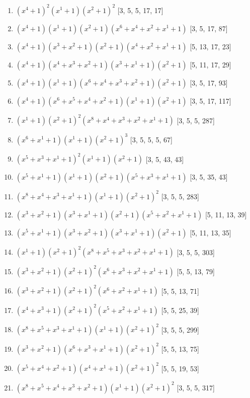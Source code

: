\documentclass[10pt,twocolumn]{article}
\begin{document}
\begin{enumerate}
\item $(x^{4} + 1)^{2}(x^{1} + 1)(x^{2} + 1)^{2}$  [3, 5, 5, 17, 17]
\item $(x^{4} + 1)(x^{1} + 1)(x^{2} + 1)(x^{6} + x^{4} + x^{2} + x^{1} + 1)$  [3, 5, 17, 87]
\item $(x^{4} + 1)(x^{3} + x^{2} + 1)(x^{2} + 1)(x^{4} + x^{2} + x^{1} + 1)$  [5, 13, 17, 23]
\item $(x^{4} + 1)(x^{4} + x^{3} + x^{2} + 1)(x^{3} + x^{1} + 1)(x^{2} + 1)$  [5, 11, 17, 29]
\item $(x^{4} + 1)(x^{1} + 1)(x^{6} + x^{4} + x^{3} + x^{2} + 1)(x^{2} + 1)$  [3, 5, 17, 93]
\item $(x^{4} + 1)(x^{6} + x^{5} + x^{4} + x^{2} + 1)(x^{1} + 1)(x^{2} + 1)$  [3, 5, 17, 117]
\item $(x^{1} + 1)(x^{2} + 1)^{2}(x^{8} + x^{4} + x^{3} + x^{2} + x^{1} + 1)$  [3, 5, 5, 287]
\item $(x^{6} + x^{1} + 1)(x^{1} + 1)(x^{2} + 1)^{3}$  [3, 5, 5, 5, 67]
\item $(x^{5} + x^{3} + x^{1} + 1)^{2}(x^{1} + 1)(x^{2} + 1)$  [3, 5, 43, 43]
\item $(x^{5} + x^{1} + 1)(x^{1} + 1)(x^{2} + 1)(x^{5} + x^{3} + x^{1} + 1)$  [3, 5, 35, 43]
\item $(x^{8} + x^{4} + x^{3} + x^{1} + 1)(x^{1} + 1)(x^{2} + 1)^{2}$  [3, 5, 5, 283]
\item $(x^{3} + x^{2} + 1)(x^{3} + x^{1} + 1)(x^{2} + 1)(x^{5} + x^{2} + x^{1} + 1)$  [5, 11, 13, 39]
\item $(x^{5} + x^{1} + 1)(x^{3} + x^{2} + 1)(x^{3} + x^{1} + 1)(x^{2} + 1)$  [5, 11, 13, 35]
\item $(x^{1} + 1)(x^{2} + 1)^{2}(x^{8} + x^{5} + x^{3} + x^{2} + x^{1} + 1)$  [3, 5, 5, 303]
\item $(x^{3} + x^{2} + 1)(x^{2} + 1)^{2}(x^{6} + x^{3} + x^{2} + x^{1} + 1)$  [5, 5, 13, 79]
\item $(x^{3} + x^{2} + 1)(x^{2} + 1)^{2}(x^{6} + x^{2} + x^{1} + 1)$  [5, 5, 13, 71]
\item $(x^{4} + x^{3} + 1)(x^{2} + 1)^{2}(x^{5} + x^{2} + x^{1} + 1)$  [5, 5, 25, 39]
\item $(x^{8} + x^{5} + x^{3} + x^{1} + 1)(x^{1} + 1)(x^{2} + 1)^{2}$  [3, 5, 5, 299]
\item $(x^{3} + x^{2} + 1)(x^{6} + x^{3} + x^{1} + 1)(x^{2} + 1)^{2}$  [5, 5, 13, 75]
\item $(x^{5} + x^{4} + x^{2} + 1)(x^{4} + x^{1} + 1)(x^{2} + 1)^{2}$  [5, 5, 19, 53]
\item $(x^{8} + x^{5} + x^{4} + x^{3} + x^{2} + 1)(x^{1} + 1)(x^{2} + 1)^{2}$  [3, 5, 5, 317]

\end{enumerate}
\end{document}
